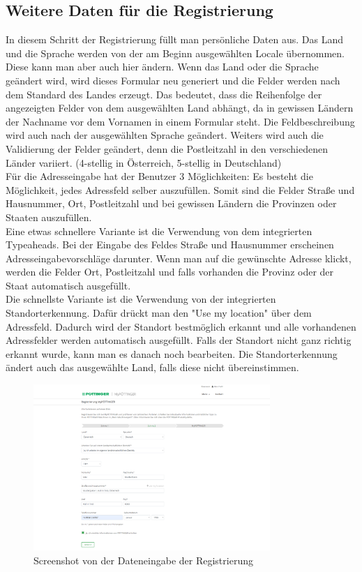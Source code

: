 \subsection{Weitere Daten für die Registrierung}
In diesem Schritt der Registrierung füllt man persönliche Daten aus. Das Land und die Sprache werden von der am Beginn ausgewählten Locale übernommen. Diese kann man aber auch hier ändern. Wenn das Land oder die Sprache geändert wird, wird dieses Formular neu generiert und die Felder werden nach dem Standard des Landes erzeugt. Das bedeutet, dass die Reihenfolge der angezeigten Felder von dem ausgewählten Land abhängt, da in gewissen Ländern der Nachname vor dem Vornamen in einem Formular steht. Die Feldbeschreibung wird auch nach der ausgewählten Sprache geändert. Weiters wird auch die Validierung der Felder geändert, denn die Postleitzahl in den verschiedenen Länder variiert. (4-stellig in Österreich, 5-stellig in Deutschland)\\

Für die Adresseingabe hat der Benutzer 3 Möglichkeiten:
Es besteht die Möglichkeit, jedes Adressfeld selber auszufüllen. Somit sind die Felder Straße und Hausnummer, Ort, Postleitzahl und bei gewissen Ländern die Provinzen oder Staaten auszufüllen.\\

Eine etwas schnellere Variante ist die Verwendung von dem integrierten Typeaheads. Bei der Eingabe des Feldes Straße und Hausnummer erscheinen Adresseingabevorschläge darunter. Wenn man auf die gewünschte Adresse klickt, werden die Felder Ort, Postleitzahl und falls vorhanden die Provinz oder der Staat automatisch ausgefüllt.\\

Die schnellste Variante ist die Verwendung von der integrierten Standorterkennung. Dafür drückt man den "Use my location" über dem Adressfeld. Dadurch wird der Standort bestmöglich erkannt und alle vorhandenen Adressfelder werden automatisch ausgefüllt. Falls der Standort nicht ganz richtig erkannt wurde, kann man es danach noch bearbeiten. Die Standorterkennung ändert auch das ausgewählte Land, falls diese nicht übereinstimmen.
\begin{figure}[H]
	\centerline{
		\includegraphics[width=0.8\textwidth]{./grafiken/erm_register_data.png}
	}
	\vskip0pt
	\caption{Screenshot von der Dateneingabe der Registrierung} \label{fig:register2}
\end{figure}

